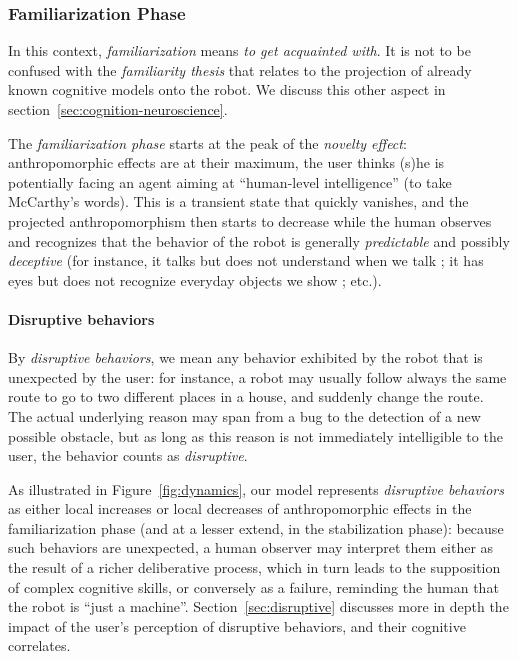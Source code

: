 \documentclass{frontiersSCNS} %
\begin{document}
\subsubsection{Familiarization Phase\\}
\label{sec:familiarization}

In this context, \emph{familiarization} means \emph{to get acquainted with}.
It is not to be confused with the \emph{familiarity thesis} that relates to the
projection of already known cognitive models onto the robot. We discuss this other
aspect in section~\ref{sec:cognition-neuroscience}.

The \emph{familiarization phase} starts at the peak of the \emph{novelty
effect}: anthropomorphic effects are at their maximum, the user thinks (s)he is
potentially facing an agent aiming at ``human-level intelligence'' (to take
McCarthy's words). This is a transient state that quickly vanishes, and the
projected anthropomorphism then starts to decrease while the human observes and
recognizes that the behavior of the robot is generally \emph{predictable} and
possibly \emph{deceptive} (for instance, it talks but does not understand when
we talk ; it has eyes but does not recognize everyday objects we show ; etc.).

\paragraph{Disruptive behaviors\\}

By \emph{disruptive behaviors}, we mean any behavior exhibited by the robot that
is unexpected by the user: for instance, a robot may usually follow always the
same route to go to two different places in a house, and suddenly change the
route. The actual underlying reason may span from a bug to the detection of a
new possible obstacle, but as long as this reason is not immediately
intelligible to the user, the behavior counts as \emph{disruptive}.

As illustrated in Figure~\ref{fig:dynamics}, our model represents
\emph{disruptive behaviors} as either local increases or local decreases of
anthropomorphic effects in the familiarization phase (and at a lesser extend, in
the stabilization phase): because such behaviors are unexpected, a human
observer may interpret them either as the result of a richer deliberative
process, which in turn leads to the supposition of complex cognitive skills, or
conversely as a failure, reminding the human that the robot is ``just a
machine''. Section~\ref{sec:disruptive} discusses more in depth the impact of
the user's perception of disruptive behaviors, and their cognitive correlates.
\end{document}
